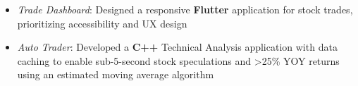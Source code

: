 \begin{itemize}
\item \textit{Trade Dashboard}: Designed a responsive \textbf{Flutter} application for stock trades, prioritizing accessibility and UX design
\item \textit{Auto Trader}: Developed a \textbf{C++} Technical Analysis application with data caching to enable sub-5-second stock speculations and \textgreater{}25\% YOY returns using an estimated moving average algorithm
\end{itemize}